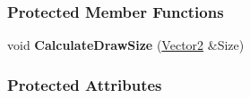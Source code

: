 \subsubsection*{Protected Member Functions}
\begin{DoxyCompactItemize}
\item 
\hypertarget{classMezzanine_1_1UI_1_1Caption_affee2de8e012505ecc76667deb7d53dd}{
void {\bfseries CalculateDrawSize} (\hyperlink{classMezzanine_1_1Vector2}{Vector2} \&Size)}
\label{classMezzanine_1_1UI_1_1Caption_affee2de8e012505ecc76667deb7d53dd}

\end{DoxyCompactItemize}
\subsubsection*{Protected Attributes}
